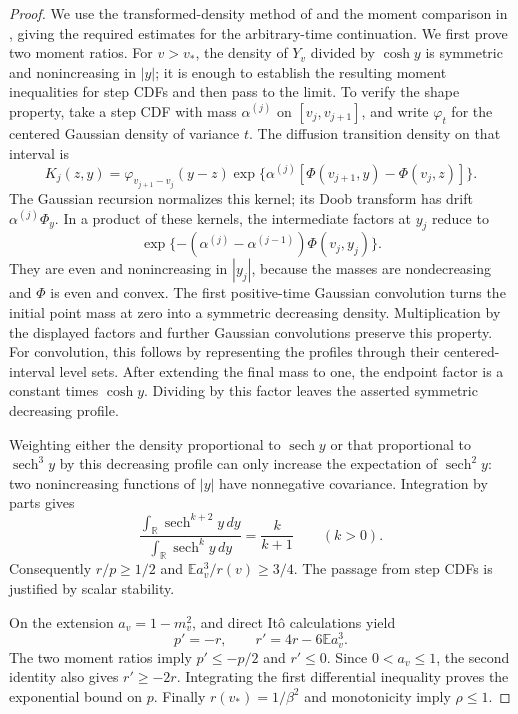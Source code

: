 \begin{proof}
We use the transformed-density method of
\cite[Proposition~7.1]{Lopatto2026} and the moment comparison in
\cite[Proposition~9.3]{Lopatto2026}, giving the required estimates for
the arbitrary-time continuation.
We first prove two moment ratios. For $v>v_*$, the density of $Y_v$
divided by $\cosh y$ is symmetric and nonincreasing in $|y|$; it is
enough to establish the resulting moment inequalities for step CDFs
and then pass to the limit. To verify the shape property, take a step
CDF with mass $\alpha^{(j)}$ on $[v_j,v_{j+1}]$, and write
$\varphi_t$ for the centered Gaussian density of variance $t$.
The diffusion transition density on that interval is
\[
 K_j(z,y)=\varphi_{v_{j+1}-v_j}(y-z)
 \exp\{\alpha^{(j)}[\Phi(v_{j+1},y)-\Phi(v_j,z)]\}.
\]
The Gaussian recursion normalizes this kernel; its Doob transform has
drift $\alpha^{(j)}\Phi_y$. In a product of these kernels, the
intermediate factors at $y_j$ reduce to
\[
 \exp\{-(\alpha^{(j)}-\alpha^{(j-1)})\Phi(v_j,y_j)\}.
\]
They are even and nonincreasing in $|y_j|$, because the masses are
nondecreasing and $\Phi$ is even and convex. The first positive-time
Gaussian convolution turns the initial point mass at zero into a
symmetric decreasing density. Multiplication by the displayed factors
and further Gaussian convolutions preserve this property. For
convolution, this follows by representing the profiles through their
centered-interval level sets. After extending the final mass to one,
the endpoint factor is a constant times $\cosh y$. Dividing by this
factor leaves the asserted symmetric decreasing profile.

Weighting either the density proportional to $\operatorname{sech}y$
or that proportional to $\operatorname{sech}^3y$ by this decreasing
profile can only increase the expectation of
$\operatorname{sech}^2y$: two nonincreasing functions of $|y|$ have
nonnegative covariance. Integration by parts gives
\[
 \frac{\int_{\mathbb R}\operatorname{sech}^{k+2}y\,dy}
      {\int_{\mathbb R}\operatorname{sech}^{k}y\,dy}
 =\frac{k}{k+1}\qquad(k>0).
\]
Consequently $r/p\ge1/2$ and $\mathbb E a_v^3/r(v)\ge3/4$.
The passage from step CDFs is justified by scalar stability.

On the extension $a_v=1-m_v^2$, and direct It\^o calculations yield
\[
 p'=-r,\qquad r'=4r-6\mathbb E a_v^3.
\]
The two moment ratios imply $p'\le-p/2$ and $r'\le0$.
Since $0<a_v\le1$, the second identity also gives $r'\ge-2r$.
Integrating the first differential inequality proves the exponential
bound on $p$. Finally $r(v_*)=1/\beta^2$ and monotonicity imply
$\rho\le1$.
\end{proof}

